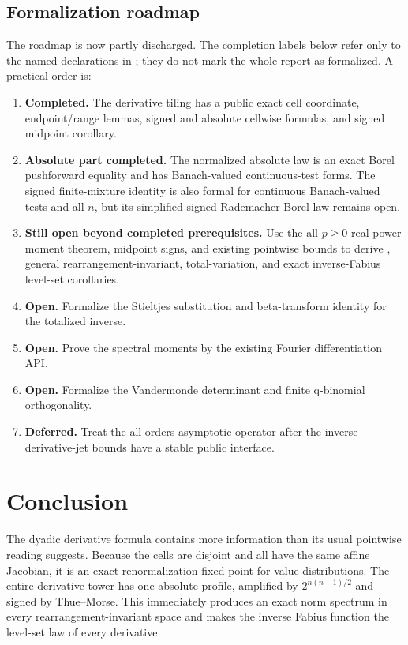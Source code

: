 \documentclass[11pt,oneside]{article}
\numberwithin{equation}{section}
\theoremstyle{plain}
\theoremstyle{definition}
\theoremstyle{remark}
\begin{document}
\subsection{Formalization roadmap}

The roadmap is now partly discharged.  The completion labels below refer only to the named
declarations in ; they do not mark the whole report
as formalized.  A practical order is:
\begin{enumerate}
\item \textbf{Completed.}  The derivative tiling has a public exact cell coordinate,
      endpoint/range lemmas, signed and absolute cellwise formulas, and signed midpoint
      corollary.
\item \textbf{Absolute part completed.}  The normalized absolute law is an exact Borel
      pushforward equality and has Banach-valued continuous-test forms.  The signed
      finite-mixture identity is also formal for continuous Banach-valued tests and all
      \(n\), but its simplified signed Rademacher Borel law remains open.
\item \textbf{Still open beyond completed prerequisites.}  Use the all-\(p\ge0\)
      real-power moment theorem, midpoint signs, and existing pointwise bounds to derive
      , general rearrangement-invariant, total-variation, and exact
      inverse-Fabius level-set corollaries.
\item \textbf{Open.}  Formalize the Stieltjes substitution and beta-transform identity for
      the totalized inverse.
\item \textbf{Open.}  Prove the spectral moments by the existing Fourier differentiation
      API.
\item \textbf{Open.}  Formalize the Vandermonde determinant and finite q-binomial
      orthogonality.
\item \textbf{Deferred.}  Treat the all-orders asymptotic operator after the inverse
      derivative-jet bounds have a stable public interface.
\end{enumerate}

\section{Conclusion}

The dyadic derivative formula contains more information than its usual pointwise reading
suggests.  Because the cells are disjoint and all have the same affine Jacobian, it is an
exact renormalization fixed point for value distributions.  The entire derivative tower has
one absolute profile, amplified by $2^{n(n+1)/2}$ and signed by Thue--Morse.  This immediately
produces an exact norm spectrum in every rearrangement-invariant space and makes the inverse
Fabius function the level-set law of every derivative.
\end{document}

